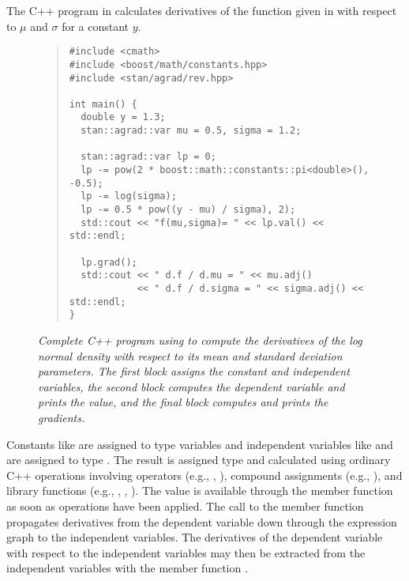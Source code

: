 \documentclass[10pt]{article}
\begin{document}
The C++ program in  calculates
derivatives of the function given in  with
respect to $\mu$ and $\sigma$ for a constant $y$.
%
\begin{figure}
\begin{quote}
\small
\begin{Verbatim}
#include <cmath>
#include <boost/math/constants.hpp>
#include <stan/agrad/rev.hpp>

int main() { 
  double y = 1.3;
  stan::agrad::var mu = 0.5, sigma = 1.2;

  stan::agrad::var lp = 0;
  lp -= pow(2 * boost::math::constants::pi<double>(), -0.5);
  lp -= log(sigma);
  lp -= 0.5 * pow((y - mu) / sigma), 2);
  std::cout << "f(mu,sigma)= " << lp.val() << std::endl;

  lp.grad();
  std::cout << " d.f / d.mu = " << mu.adj()
            << " d.f / d.sigma = " << sigma.adj() << std::endl;
}
\end{Verbatim}
\end{quote}
\vspace*{-12pt}
\caption{\small\it Complete C++ program using  to
  compute the derivatives of the log normal density with respect to
  its mean and standard deviation parameters.  The first block assigns
  the constant and independent variables, the second block computes
  the dependent variable and prints the value, and the final block
  computes and prints the
  gradients.}\label{normal-log-gradient-cpp.figure}
\end{figure}
%
Constants like  are assigned to type  variables
and independent variables like  and  are assigned
to type .  The result  is assigned type 
and calculated using ordinary C++ operations involving operators
(e.g., \code{*}, \code{/}), compound assignments (e.g., \code{-=}),
and library functions (e.g., , , ).  The
value is available through the member function  as soon as
operations have been applied.  The call to the member function
 propagates derivatives from the dependent variable
 down through the expression graph to the independent
variables.  The derivatives of the dependent variable with respect to
the independent variables may then be extracted from the independent
variables with the member function .
\end{document}
